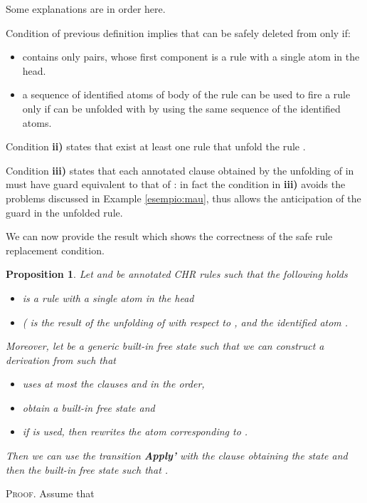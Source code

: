 \documentclass[final]{acmtrans2e}
\newtheorem{proposition}[theorem]{Proposition}
\begin{document}
Some explanations are in order here.

Condition  of previous definition implies that
 can be
safely deleted from  only if:
\begin{itemize}
\item  contains only pairs, whose
first component is a rule with a single atom in the head.

\item  a sequence of identified atoms of
body of the rule  can be used to fire a rule 
only if  can be unfolded with   by using the same sequence
of the identified atoms.

\end{itemize}

Condition {\bf ii)} states that exist at least one rule that unfold
the rule .

Condition {\bf iii)}  states that each annotated clause obtained by the
unfolding of  in  must have guard equivalent to that of : in fact
the condition   in {\bf iii)} avoids the
problems discussed in Example \ref{esempio:mau}, thus allows the anticipation
of the guard in the unfolded rule.


We can now provide the result which shows the correctness of the safe rule replacement condition.

\begin{proposition}\label{lemma:servcomplete}
Let  and  be annotated CHR rules such that the following holds
\begin{itemize}
  \item  is a rule with a single atom in the head
  \item (  is the result
of the unfolding of  with respect to ,  and the identified atom .
\end{itemize}
Moreover, let  be a generic built-in free state such that we can
construct a derivation  from  such that
\begin{itemize}
  \item  uses at most the clauses  and  in the order,
  \item obtain a built-in free state  and
  \item if  is used, then  rewrites the atom  corresponding to .
\end{itemize}
Then we can use the transition \textbf{Apply'} with the clause  obtaining the state  and then the built-in free state  such that .
\end{proposition}


\textsc{Proof.}
Assume that
\end{document}
